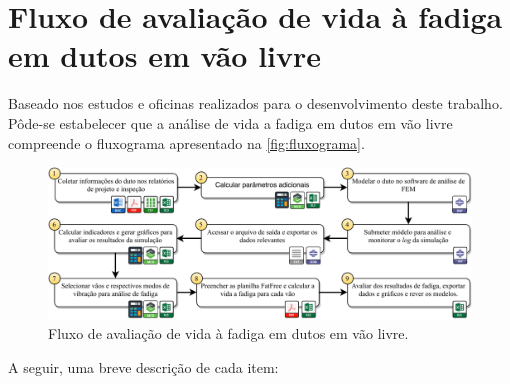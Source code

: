 \section{Fluxo de avaliação de vida à fadiga em dutos em vão livre}\label{chap:workflow}


Baseado nos estudos e oficinas realizados para o desenvolvimento deste trabalho. Pôde-se estabelecer que a análise de vida a fadiga em dutos em vão livre compreende o fluxograma apresentado na \autoref{fig:fluxograma}.

\begin{figure}[!ht]
    \centering
    \caption{Fluxo de avaliação de vida à fadiga em dutos em vão livre.}\label{fig:fluxograma}
    \includegraphics[width=\textwidth]{imagens/fluxograma.pdf}
\end{figure}

A seguir, uma breve descrição de cada item:

